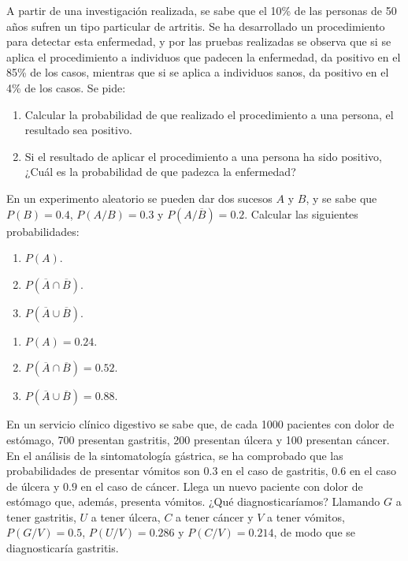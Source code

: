 {A partir de una investigación realizada, se sabe que el 10\% de las personas de 50 años sufren un tipo particular de
artritis.
Se ha desarrollado un procedimiento para detectar esta enfermedad, y por las pruebas realizadas se observa que si se
aplica el procedimiento a individuos que padecen la enfermedad, da positivo en el 85\% de los casos, mientras que
si se aplica a individuos sanos, da positivo en el 4\% de los casos.
Se pide:
\begin{enumerate}
\item  Calcular la probabilidad de que realizado el procedimiento a una persona, el resultado sea positivo.
\item  Si el resultado de aplicar el procedimiento a una persona ha sido positivo, ¿Cuál es la probabilidad de que
padezca la enfermedad?
\end{enumerate}
}
{}
{}


{En un experimento aleatorio se pueden dar dos sucesos $A$ y $B$, y se sabe que $P(B)=0.4$, $P(A/B)=0.3$ y
$P(A/\overline{B})=0.2$.
Calcular las siguientes probabilidades:
\begin{enumerate}
\item $P(A)$.
\item $P(\overline{A}\cap \overline{B})$.
\item $P(\overline{A}\cup \overline{B})$.
\end{enumerate}
}
{
\begin{enumerate}
\item $P(A)=0.24$.
\item $P(\overline{A}\cap \overline{B})=0.52$.
\item $P(\overline{A}\cup \overline{B})=0.88$.
\end{enumerate}
}
{}


{En un servicio clínico digestivo se sabe que, de cada 1000 pacientes con dolor de estómago, 700 presentan gastritis,
200 presentan úlcera y 100 presentan cáncer.
En el análisis de la sintomatología gástrica, se ha comprobado que las probabilidades de presentar vómitos son $0.3$ en
el caso de gastritis, $0.6$ en el caso de úlcera y $0.9$ en el caso de cáncer.
Llega un nuevo paciente con dolor de estómago que, además, presenta vómitos.
¿Qué diagnosticaríamos?}
{Llamando $G$ a tener gastritis, $U$ a tener úlcera, $C$ a tener cáncer y $V$ a tener vómitos, $P(G/V)=0.5$,
$P(U/V)=0.286$ y $P(C/V)=0.214$, de modo que se diagnosticaría gastritis.}
{}



